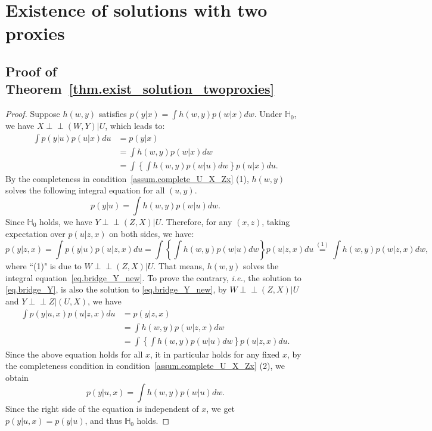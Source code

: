 \documentclass[
  12pt]{article}
\newcommand{\ind}{\perp\!\!\!\!\perp}
\def\mH{\mathbb{H}}
\begin{document}





% 


\section{Existence of solutions with two proxies}
\label{appx.two}

\subsection{Proof of Theorem~\ref{thm.exist_solution_twoproxies}}
\label{appx.two_exist}


\solutionsexisttwoproxies*
\begin{proof}
Suppose $h(w,y)$ satisfies $p(y|x)=\int{h(w,y)p(w|x)dw}$. Under $\mathbb{H}_0$, we have $X\ind (W,Y)|U$, which leads to:
$$
\begin{aligned}
	\int{p(y|u) p(u|x) du}&=p(y|x) \\
    & =\int{h(w,y) p(w|x) dw}\\
	&=\int{\left\{ \int{h(w,y) p(w|u) dw} \right\} p(u|x) du}.
\end{aligned}
$$
By the completeness in condition~\ref{assum.complete_U_X_Zx} (1), $h(w,y)$ 
solves the following integral equation for all $(u,y)$. 
$$
p(y|u) =\int{h(w,y) p(w|u)dw}.
$$
Since $\mathbb H_0$ holds, we have $Y\ind (Z,X)|U$. Therefore, for any $(x,z)$, taking expectation over $p(u|z,x)$ on both sides, we have:
$$
p(y|z,x) = \int{p(y|u) p(u|z,x) du} =\int{\left\{ \int{h(w,y) p(w|u) dw} \right\} p(u|z,x) du} \overset{(1)}{=} \int h(w,y)p(w|z,x)dw,
$$
where ``(1)" is due to $W\ind (Z,X)|U$. That means, $h(w,y)$ solves the integral equation~\eqref{eq.bridge_Y_new}. 
To prove the contrary, \emph{i.e.}, the solution to \eqref{eq.bridge_Y}, is also the solution to \eqref{eq.bridge_Y_new}, by $W\ind (Z,X)|U$ and $Y\ind Z|(U,X)$, we have
$$
\begin{aligned}
	\int{p(y|u,x) p(u|z,x) du}&=p(y|z,x)\\
	&=\int{h(w,y) p(w|z,x) dw}\\
	&=\int{\left\{ \int{h(w,y) p(w|u) dw} \right\} p(u|z,x) du}.
\end{aligned}
$$
Since the above equation holds for all $x$, it in particular holds for any fixed $x$, by the completeness condition in condition~\ref{assum.complete_U_X_Zx} (2), we obtain
$$
p(y|u,x)=\int{h(w,y) p(w|u)dw}.
$$
Since the right side of the equation is independent of $x$, we get $p(y|u,x)=p(y|u)$, and thus $\mH_0$ holds. 
\end{proof}
\end{document}
